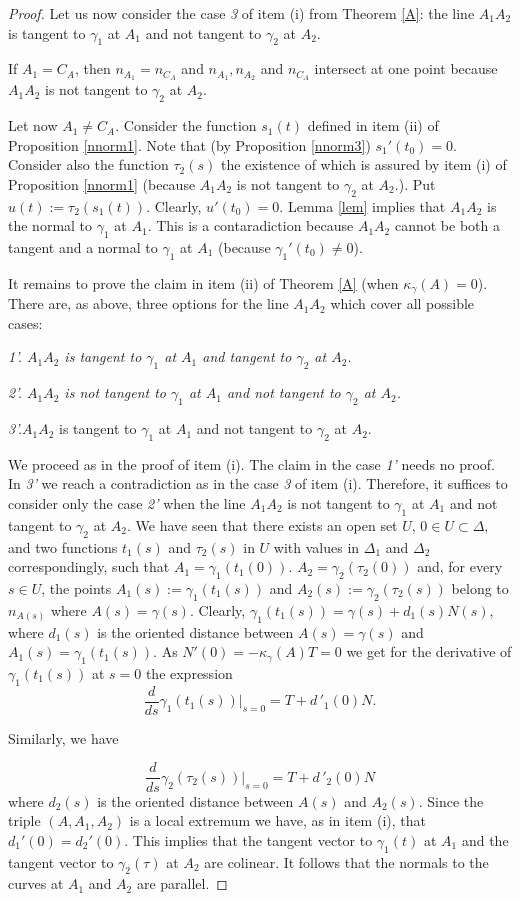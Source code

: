 \documentclass[10pt,a4paper]{amsart}
\def\g{\gamma}
\begin{document}
\begin{proof}
Let us now consider the case \emph{3} of item (i) from Theorem \ref{A}: the line $A_1A_2$ is tangent to $\g_1$ at $A_1$ and not tangent to
$\g_2$ at $A_2$.

If $A_1=C_A$, then
$n_{A_1}=n_{C_A}$ and  $n_{A_1}, n_{A_2}$ and $n_{C_A}$ intersect at one point because $A_1A_2$ is not tangent to $\g_2$ at $A_2$.

Let now $A_1\neq C_A$. Consider the function
$s_1(t)$ defined in item (ii) of Proposition \ref{nnorm1}. Note that (by Proposition
\ref{nnorm3}) $s_1'(t_0)=0$. Consider also the function $\tau_2(s)$ the existence of which is assured by item (i) of Proposition \ref{nnorm1}
(because $A_1A_2$ is not tangent to $\g_2$ at $A_2$.). Put $u(t):=\tau_2(s_1(t))$. Clearly, $u'(t_0)=0$. Lemma \ref{lem} implies that $A_1A_2$ is the normal to $\g_1$ at $A_1$. This is a contaradiction because $A_1A_2$ cannot be both a tangent and a normal to $\g_1$ at $A_1$ (because $\g_1'(t_0) \neq 0 $).

\medskip
It remains to prove the claim in item (ii) of  Theorem \ref{A} (when
$\kappa_{\g}(A)=0$).  There are, as above, three options for the line $A_1A_2$ which cover all possible cases:

\emph{1'. $A_1A_2$ is tangent to $\g_1$ at $A_1$ and  tangent to $\g_2$ at $A_2$.}

\emph{2'. $A_1A_2$ is not tangent to $\g_1$ at $A_1$ and not tangent to $\g_2$
at $A_2$. }

\emph{3'.}$ A_1A_2$ is tangent to $\g_1$ at $A_1$ and not tangent to $\g_2$
at $A_2$.

We proceed as in the proof of item (i).  The claim in the case \emph{1' } needs no proof. In \emph{3'} we reach a contradiction as in the case  \emph{3} of item (i). Therefore, it suffices to consider only the case \emph{2'} when the line
$A_1A_2$ is not tangent to $\g_1$ at $A_1$
and not tangent to $\g_2$ at $A_2$. We have seen that there exists an open set
$U$, $0 \in U \subset \Delta$, and two functions
$t_1(s)$ and $\tau_2(s)$ in $U$ with values in
$\Delta_1$ and $\Delta_2$ correspondingly,  such that $A_1=\g_1(t_1(0))$.
$A_2 = \g_2(\tau_2(0))$
and, for every $s \in U$, the points
$A_1(s):=\g_1(t_1(s)) $ and $A_2(s):=\g_2(\tau_2(s))$ belong to $n_{A(s)}$
where $A(s) = \g(s)$. Clearly,
$\g_1(t_1(s)) = \g(s) +d_1(s) N(s)$, where $d_1(s)$ is the oriented distance between
$A(s) = \g(s)$ and $A_1(s)=\g_1(t_1(s))$.  As
$N'(0)=-\kappa_{\g}(A)T=0$ we get for the derivative of $\g_1(t_1(s)) $ at $s=0$ the expression
$$\frac{d}{ds}\g_1(t_1(s))|_{s=0}=
T+d\,'_1(0)N.$$


Similarly, we have

$$\frac{d}{ds}\g_2(\tau_2(s))|_{s=0}=
T+d\,'_2(0)N$$
where $d_2(s)$ is the oriented distance between $A(s)$ and $A_2(s)$.
Since the triple $(A, A_1,A_2)$ is a local extremum
we have, as in item (i), that $d_1'(0)=d_2'(0)$. This implies that the tangent vector to
$\g_1(t)$ at $A_1$ and the tangent vector to $\g_2(\tau)$ at $A_2$ are colinear. It follows that the normals to the curves at $A_1$ and $A_2$ are parallel.
\end{proof}
\end{document}
